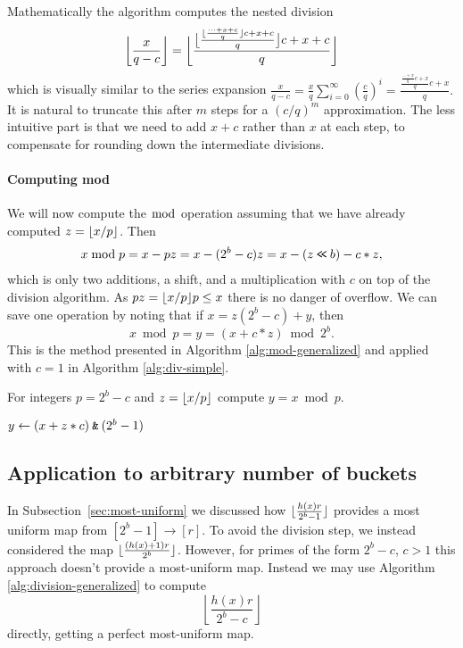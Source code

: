 Mathematically the algorithm computes the nested division
$$
\bbfloor{\frac{x}{q-c}}
=
\bbfloor{\frac{
   \bfloor{\frac{
      \floor{\frac{
         \dots+x+c
      }{q}}c +x+c
   }{q}}c +x+c
}{q}}
\vspace{-1em} %
$$
which is visually similar to the series expansion
$
   \frac{x}{q-c}
   = \frac{x}{q}\sum_{i=0}^\infty (\frac{c}{q})^i
   = \frac{\frac{\frac{\dots+x}{q}c+x}{q}c+x}{q}.
$
It is natural to truncate this after $m$ steps for a $(c/q)^m$ approximation.
The less intuitive part is that we need to add $x+c$ rather than $x$ at each step, to compensate for rounding down the intermediate divisions.

\paragraph{Computing mod}
We will now compute the $\bmod$ operation assuming that
we have already computed $z=\lfloor {x/p} \rfloor$. Then
\begin{align}
   x \bmod p
   = x - pz
   = x - (2^b-c)z
   = x - (z\mathbin{\texttt{<\!<}} b) - c*z,
\end{align}
which is only two additions, a shift, and a multiplication with $c$ on top of the division algorithm.
As $pz = \lfloor {x/p} \rfloor p \le x$ there is no danger of overflow.
We can save one operation by noting
that if $x = z (2^b-c) + y$, then
$$x\bmod p = y=\left(x+c*z \right) \bmod 2^b.$$
This is the method presented in Algorithm \ref{alg:mod-generalized} and applied with $c=1$ in Algorithm \ref{alg:div-simple}.
\begin{algorithm}[H]
   \caption{For integers $p=2^b-c$ and $z=\lfloor {x/p} \rfloor$ compute
      $y=x \bmod p$.}
   \label{alg:mod-generalized}
   \begin{algorithmic}
      \State $y \gets (x + z*c) \mathbin{\texttt{\&}} (2^b-1)$
   \end{algorithmic}
\end{algorithm}




\subsection{Application to arbitrary number of buckets}\label{sec:pseudo-arbitrary}
In Subsection~\ref{sec:most-uniform} we discussed how $\lfloor {\frac{h(x)r}{2^b-1}} \rfloor$ provides a most uniform map from $[2^b-1]\to[r]$.
To avoid the division step, we instead considered the map
$\lfloor {\frac{(h(x)+1)r}{2^b}} \rfloor$.
However, for primes of the form $2^b-c$, $c>1$ this approach doesn't provide a most-uniform map.
%
Instead we may use Algorithm \ref{alg:division-generalized} to compute
$$\left\lfloor\frac{h(x)r}{2^b-c}\right\rfloor$$
directly, getting a perfect most-uniform map.


